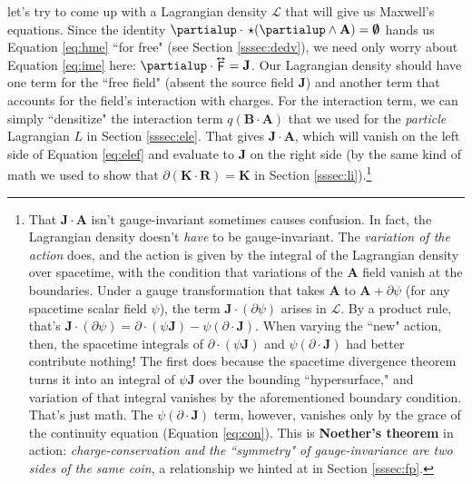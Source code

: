 \documentclass[12pt]{article}
\renewcommand{\vv}[1]{\mathbf{#1}}
\newcommand{\tightoverset}[2]{%
  \mathop{#2}\limits^{\vbox to -.5ex{\kern-0.75ex\hbox{$#1$}\vss}}}
\newcommand{\inlinedy}[1]{\tightoverset{\text{\tiny$\bm\leftrightarrow$}}{#1}}
\begin{document}
let's try to come up with a Lagrangian density $\mathcal{L}$ that will give us Maxwell's equations. Since the identity $\partialup \cdot \, \star ( \partialup \wedge \vv A ) = \textrm{\mbox{\boldmath $\emptyset$}}$ hands us Equation \ref{eq:hme} ``for free" (see Section \ref{sssec:dedv}), we need only worry about Equation \ref{eq:ime} here: $\partialup \cdot \inlinedy{\mathsf{F}} = \vv J$. Our Lagrangian density should have one term for the ``free field" (absent the source field $\vv J$) and another term that accounts for the field's interaction with charges. For the interaction term, we can simply ``densitize" the interaction term $q (\vv B \cdot \vv A)$ that we used for the \emph{particle} Lagrangian $L$ in Section \ref{sssec:ele}. That gives $\vv J \cdot \vv A$, which will vanish on the left side of Equation \ref{eq:elef} and evaluate to $\vv J$ on the right side (by the same kind of math we used to show that $\partialup ( \vv K \cdot \vv R ) = \vv K$ in Section \ref{sssec:li}).\footnote{That $\vv J \cdot \vv A$ isn't gauge-invariant sometimes causes confusion. In fact, the Lagrangian density doesn't \emph{have} to be gauge-invariant. The \emph{variation of the action} does, and the action is given by the integral of the Lagrangian density over spacetime, with the condition that variations of the $\vv A$ field vanish at the boundaries. Under a gauge transformation that takes $\vv A$ to $\vv A + \partialup \psi$ (for any spacetime scalar field $\psi$), the term $\vv J \cdot ( \partialup \psi )$ arises in $\mathcal{L}$. By a product rule, that's $\vv J \cdot ( \partialup \psi ) = \partialup \cdot (\psi \vv J) - \psi  ( \partialup \cdot \vv J )$. When varying the ``new" action, then, the spacetime integrals of $\partialup \cdot (\psi \vv J)$ and $\psi ( \partialup \cdot \vv J )$ had better contribute nothing! The first does because the spacetime divergence theorem turns it into an integral of $\psi \vv J$ over the bounding ``hypersurface," and variation of that integral vanishes by the aforementioned boundary condition. That's just math. The $\psi ( \partialup \cdot \vv J )$ term, however, vanishes only by the grace of the continuity equation (Equation \ref{eq:con}). This is \textbf{Noether's theorem} in action: \emph{charge-conservation and the ``symmetry" of gauge-invariance are two sides of the same coin}, a relationship we hinted at in Section \ref{sssec:fp}.}
\end{document}
